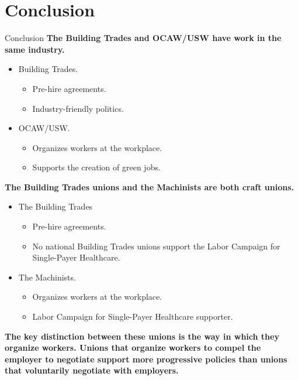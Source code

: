 \documentclass{beamer}
\begin{document}
\section{Conclusion}
\begin{frame}{Conclusion}
\textbf{The Building Trades and OCAW/USW have work in the same industry.}
\begin{itemize}
	\item Building Trades.
	\begin{itemize}
		\item Pre-hire agreements.
		\item Industry-friendly politics.
  	\end{itemize}
  	\item OCAW/USW.
  	\begin{itemize}
  		\item Organizes workers at the workplace.
  		\item Supports the creation of green jobs.
  	\end{itemize}
\end{itemize}
  		
\textbf{The Building Trades unions and the Machinists are both craft unions.}
\begin{itemize}
	\item The Building Trades
	\begin{itemize}
		\item Pre-hire agreements.
		\item No national Building Trades unions support the Labor Campaign for Single-Payer Healthcare.
	\end{itemize}
  	\item The Machinists.
  	\begin{itemize}
  		\item Organizes workers at the workplace.
  		\item Labor Campaign for Single-Payer Healthcare supporter.
  	\end{itemize}
\end{itemize}
\textbf{The key distinction between these unions is the way in which they organize workers.\newline\newline
Unions that organize workers to compel the employer to negotiate support more progressive policies than unions that voluntarily negotiate with employers.}
\end{frame}

\end{document}
